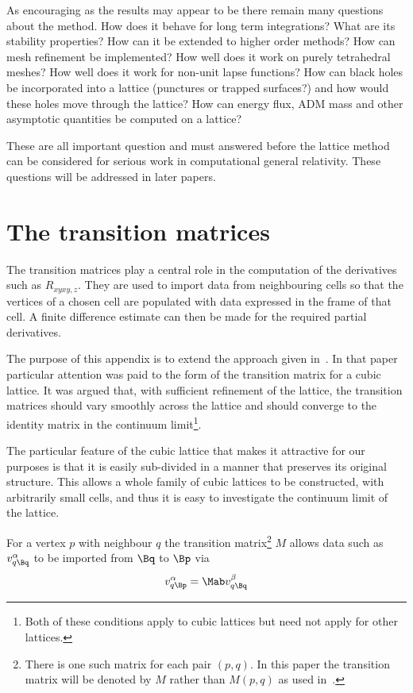 \documentclass[a4paper,12pt]{article}
\numberwithin{equation}{section}
\begin{document}
As encouraging as the results may appear to be there remain many questions about the method.
How does it behave for long term integrations? What are its stability properties? How can it
be extended to higher order methods? How can mesh refinement be implemented? How well does
it work on purely tetrahedral meshes? How well does it work for non-unit lapse functions?
How can black holes be incorporated into a lattice (punctures or trapped surfaces?) and how
would these holes move through the lattice? How can energy flux, ADM mass and other
asymptotic quantities be computed on a lattice?

These are all important question and must answered before the lattice method can be
considered for serious work in computational general relativity. These questions will be
addressed in later papers.

\appendix

\section{The transition matrices}
\label{sec:TransMatrix}

The transition matrices play a central role in the computation of the derivatives such as
$R_{xyxy,z}$. They are used to import data from neighbouring cells so that the vertices of a
chosen cell are populated with data expressed in the frame of that cell. A finite difference
estimate can then be made for the required partial derivatives.

The purpose of this appendix is to extend the approach given in~\cite{brewin:2014-01}. In
that paper particular attention was paid to the form of the transition matrix for a cubic
lattice. It was argued that, with sufficient refinement of the lattice, the transition
matrices should vary smoothly across the lattice and should converge to the identity matrix
in the continuum limit\footnote{Both of these conditions apply to cubic lattices but need
not apply for other lattices.}.

The particular feature of the cubic lattice that makes it attractive for our purposes is
that it is easily sub-divided in a manner that preserves its original structure. This allows
a whole family of cubic lattices to be constructed, with arbitrarily small cells, and
thus it is easy to investigate the continuum limit of the lattice.

For a vertex $p$ with neighbour $q$ the transition matrix\footnote{There is one such matrix
for each pair $(p,q)$. In this paper the transition matrix will be denoted by $M$ rather
than $M(p,q)$ as used in~\cite{brewin:2014-01}.} $M$ allows data such as $v^\alpha_{q\Bq}$
to be imported from $\Bq$ to $\Bp$ via
\begin{align}
   \label{eqn:TransMabA}
   v^\alpha_{q\Bp} = \Mab v^\beta_{q\Bq}
\end{align}
\end{document}
